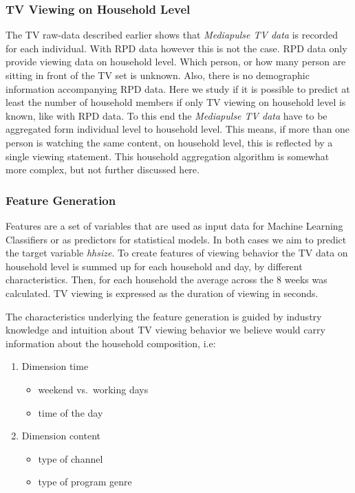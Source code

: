 \documentclass[]{article}
\providecommand{\tightlist}{%
  \setlength{\itemsep}{0pt}\setlength{\parskip}{0pt}}
\begin{document}
\hypertarget{tv-viewing-on-household-level}{%
\subsubsection{TV Viewing on Household
Level}\label{tv-viewing-on-household-level}}

The TV raw-data described earlier shows that \emph{Mediapulse TV data}
is recorded for each individual. With RPD data however this is not the
case. RPD data only provide viewing data on household level. Which
person, or how many person are sitting in front of the TV set is
unknown. Also, there is no demographic information accompanying RPD
data. Here we study if it is possible to predict at least the number of
household members if only TV viewing on household level is known, like
with RPD data. To this end the \emph{Mediapulse TV data} have to be
aggregated form individual level to household level. This means, if more
than one person is watching the same content, on household level, this
is reflected by a single viewing statement. This household aggregation
algorithm is somewhat more complex, but not further discussed here.

\hypertarget{feature-generation}{%
\subsubsection{Feature Generation}\label{feature-generation}}

Features are a set of variables that are used as input data for Machine
Learning Classifiers or as predictors for statistical models. In both
cases we aim to predict the target variable \emph{hhsize}. To create
features of viewing behavior the TV data on household level is summed up
for each household and day, by different characteristics. Then, for each
household the average across the 8 weeks was calculated. TV viewing is
expressed as the duration of viewing in seconds.

The characteristics underlying the feature generation is guided by
industry knowledge and intuition about TV viewing behavior we believe
would carry information about the household composition, i.e:

\begin{enumerate}
\def\labelenumi{\arabic{enumi}.}
\tightlist
\item
  Dimension time

  \begin{itemize}
  \tightlist
  \item
    weekend vs.~working days
  \item
    time of the day
  \end{itemize}
\item
  Dimension content

  \begin{itemize}
  \tightlist
  \item
    type of channel
  \item
    type of program genre
  \end{itemize}
\end{enumerate}
\end{document}
